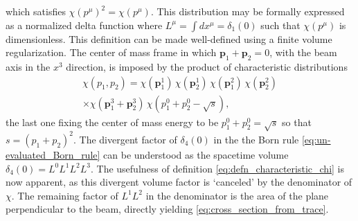 \documentclass[pra,aps,amsmath,amssymb,notitlepage, twocolumn,superscriptaddress,longbibliography,nofootinbib,floatfix,10pt]{revtex4-2}
\begin{document}
which satisfies $\chi(p^\mu)^2=\chi(p^\mu)$. This distribution may be formally expressed as a normalized delta function where $L^\mu = \int dx^\mu=\delta_1(0)$ such that $\chi(p^\mu)$ is dimensionless. This definition can be made well-defined using a finite volume regularization. The center of mass frame in which $\mathbf{p}_1+\mathbf{p}_2=0$, with the beam axis in the $x^3$ direction, is imposed by the product of characteristic distributions
\begin{multline}\label{eq:com_f_function}
    \chi(p_1,p_2)=\chi(\mathbf{p}_1^1)\, \chi(\mathbf{p}_2^1)\, \chi(\mathbf{p}_1^2)\, \chi(\mathbf{p}_2^2)\\
    \times\chi(\mathbf{p}_1^3+\mathbf{p}_2^3)\, \chi(p_1^0+p_2^0-\sqrt{s}),%
\end{multline}
 the last one fixing the center of mass energy to be $p^0_1+p^0_2=\sqrt{s}$ so that $s=(p_1+p_2)^2$. The divergent factor of $\delta_4(0)$ in the the Born rule \eqref{eq:un-evaluated_Born_rule} can be understood as the spacetime volume $\delta_4(0)=L^0L^1L^2L^3$. The usefulness of definition \eqref{eq:defn_characteristic_chi} is now apparent, as this divergent volume factor is `canceled' by the denominator of $\chi$. The remaining factor of $L^1L^2$ in the denominator is the area of the plane perpendicular to the beam, directly yielding \eqref{eq:cross_section_from_trace}.
\end{document}
